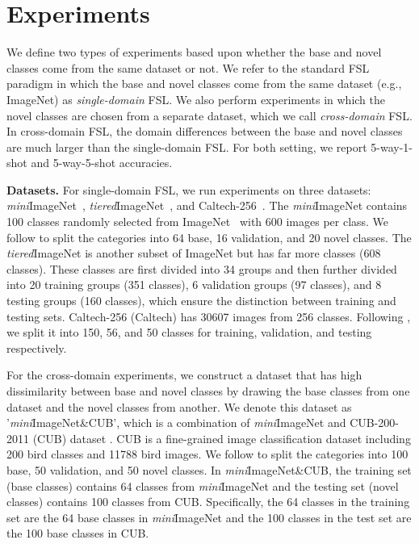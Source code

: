 \documentclass[final]{cvpr}
\newcommand{\secvspace}{\vspace{-0.0em}}
\begin{document}
\secvspace
\section{Experiments}
\secvspace



We define two types of experiments based upon whether the base and novel classes come from the same dataset or not. We refer to the standard FSL paradigm in which the base and novel classes come from the same dataset (e.g., ImageNet) as \textit{single-domain} FSL. We also perform experiments in which the novel classes are chosen from a separate dataset, which we call \textit{cross-domain} FSL. In cross-domain FSL, the domain differences between the base and novel classes are much larger than the single-domain FSL. For both setting, we report 5-way-1-shot and 5-way-5-shot accuracies.

\textbf{Datasets.} For single-domain FSL, we run experiments on three datasets: \emph{mini}ImageNet~\cite{matchingnet_1shot}, \emph{tiered}ImageNet~\cite{ren2018meta}, and Caltech-256~\cite{griffin2007caltech}. 
The \emph{mini}ImageNet contains 100 classes randomly selected from ImageNet~\cite{deng2009imagenet} with 600 images per class. We follow \cite{Sachin2017} to split the categories into 64 base, 16 validation, and 20 novel classes. The \emph{tiered}ImageNet is another subset of ImageNet but has far more classes (608 classes). These classes are first divided into 34 groups and then further divided into 20 training groups (351 classes), 6 validation groups (97 classes), and 8 testing groups (160 classes), which ensure the distinction between training and testing sets. Caltech-256 (Caltech) has 30607 images from 256 classes. Following \cite{chen2019multi}, we split it into 150, 56, and 50 classes for training, validation, 
and testing respectively. 



For the cross-domain experiments, we construct a dataset that has high dissimilarity between base and novel classes by drawing the base classes from one dataset and the novel classes from another. 
We denote this dataset as '\emph{mini}ImageNet\&CUB', which is a combination of \emph{mini}ImageNet and CUB-200-2011 (CUB) dataset \cite{wah2011caltech}. 
CUB is a fine-grained image classification dataset including 200 bird classes and 11788 bird images. We follow \cite{2018arXiv180204376H} to split the categories into 100 base, 50 validation, and 50 novel classes. 
In \emph{mini}ImageNet\&CUB, the training set (base classes) contains 64 classes from \emph{mini}ImageNet and the testing set (novel classes) contains 100 classes from CUB. Specifically, the 64 classes in the training set are the 64 base classes in \emph{mini}ImageNet and the 100 classes in the test set are the 100 base classes in CUB.
\end{document}
